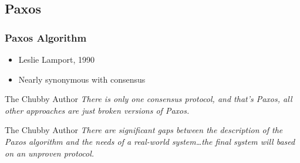 \subsection{Paxos}

\begin{frame}
    \frametitle{Paxos Algorithm}
    \begin{itemize}
        \item Leslie Lamport, 1990
        \item Nearly synonymous with consensus
    \end{itemize}
    \begin{block}{The Chubby Author}
        \emph{There is only one consensus protocol, and that's Paxos, all other approaches are just broken versions of Paxos.} \\
    \end{block}
    \begin{block}{The Chubby Author}
        \emph{There are significant gaps between the description of the Paxos algorithm and the needs of a real-world system\ldots the final system will based on an unproven protocol.}
    \end{block}
\end{frame}
